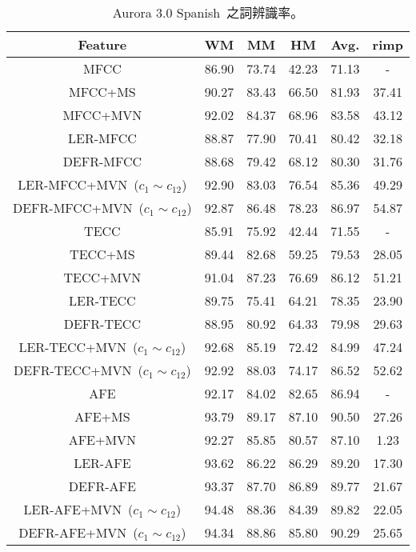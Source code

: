 \begin{table}[!htb]
\renewcommand{\arraystretch}{1.1}
\centering
\caption{Aurora 3.0 Spanish~之詞辨識率。}
\label{table:aurora3_spanish}  
\vspace{2mm}
\begin{tabular}{c|ccc|c|c}
\hline 
Feature & WM & MM & HM & Avg. & rimp  \\ 
\hline \hline
{MFCC}  & 86.90 & 73.74 & 42.23 & 71.13 & -\\
{MFCC+MS}  & 90.27 & 83.43 & 66.50 & 81.93 & 37.41\\
{MFCC+MVN}  & 92.02 & 84.37 & 68.96  & 83.58 & 43.12\\
{LER-MFCC}  & 88.87 & 77.90 & 70.41 & 80.42 & 32.18\\
{DEFR-MFCC}  & 88.68 & 79.42 & 68.12 & 80.30 & 31.76\\
{LER-MFCC+MVN~($c_1 \sim c_{12}$)} & 92.90 & 83.03 & 76.54 & 85.36 & 49.29\\
{DEFR-MFCC+MVN~($c_1 \sim c_{12}$)}  & 92.87 & 86.48 & 78.23  & 86.97 & 54.87\\
\hline
{TECC}   & 85.91 & 75.92 & 42.44 & 71.55 & -\\
{TECC+MS}  & 89.44 & 82.68 & 59.25 & 79.53 & 28.05\\
{TECC+MVN}  & 91.04 & 87.23 & 76.69 & 86.12 & 51.21\\
{LER-TECC}  &89.75 & 75.41 & 64.21 & 78.35 & 23.90\\
{DEFR-TECC}  &88.95 & 80.92 & 64.33 & 79.98 & 29.63\\
{LER-TECC+MVN~($c_1 \sim c_{12}$)}  & 92.68 & 85.19 & 72.42 & 84.99 & 47.24\\
{DEFR-TECC+MVN~($c_1 \sim c_{12}$)} & 92.92 & 88.03 & 74.17 & 86.52 & 52.62\\
\hline
{AFE}  &  92.17 & 84.02 & 82.65  & 86.94 & -\\
{AFE+MS}  & 93.79 & 89.17 & 87.10  & 90.50 & 27.26\\
{AFE+MVN}  &92.27 & 85.85 & 80.57 & 87.10 & 1.23\\
{LER-AFE}  &93.62 & 86.22 & 86.29 & 89.20 & 17.30\\
{DEFR-AFE}  & 93.37 & 87.70 & 86.89  & 89.77 & 21.67\\
{LER-AFE+MVN~($c_1 \sim c_{12}$)}  & 94.48 & 88.36 & 84.39 & 89.82 & 22.05\\
{DEFR-AFE+MVN~($c_1 \sim c_{12}$)}  & 94.34 & 88.86 & 85.80 & 90.29 & 25.65\\
\hline
\end{tabular}
\end{table}

